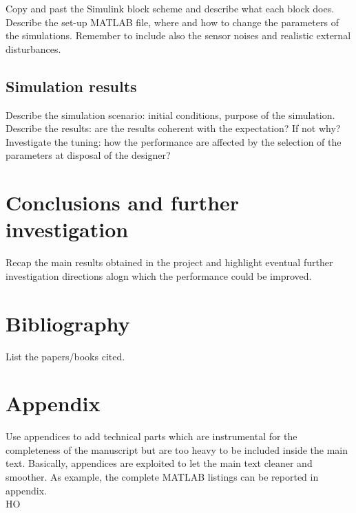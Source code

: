 \documentclass[]{report}
\begin{document}
\begin{center}
	\end{center}
	Copy and past the Simulink block scheme and describe what each block does. Describe the set-up MATLAB file, where and how to change the parameters of the simulations. Remember to include also the sensor noises and realistic external disturbances.
	
	\section{Simulation results}
	Describe the simulation scenario: initial conditions, purpose of the simulation. Describe the results: are the results coherent with the expectation? If not why? Investigate the tuning: how the performance are affected by the selection of the parameters at disposal of the designer?
	
	\chapter{Conclusions and further investigation}
	Recap the main results obtained in the project and highlight eventual further investigation directions alogn which the performance could be improved. 
	
	\newpage
	\chapter*{Bibliography}
	List the papers/books cited.
	
	\newpage
	\appendix
	\chapter*{Appendix}
	Use appendices to add technical parts which are instrumental for the completeness of the manuscript but are too heavy to be included inside the main text. Basically, appendices are exploited to let the main text cleaner and smoother. As example, the complete MATLAB listings can be reported in appendix.\\
	
	HO
	
\end{document}
